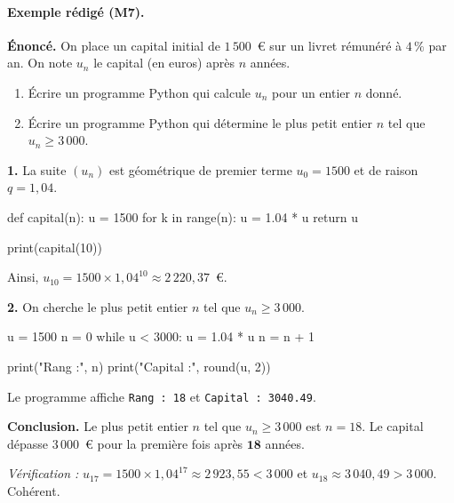 \paragraph{Exemple r\'edig\'e (M7).}

\textbf{\'Enonc\'e.} On place un capital initial de $1\,500$~\euro{} sur un livret r\'emun\'er\'e \`a $4\,\%$ par an. On note $u_n$ le capital (en euros) apr\`es $n$ ann\'ees.

\begin{enumerate}
  \item \'Ecrire un programme Python qui calcule $u_n$ pour un entier $n$ donn\'e.
  \item \'Ecrire un programme Python qui d\'etermine le plus petit entier $n$ tel que $u_n \geq 3\,000$.
\end{enumerate}

\medskip
\textbf{1.} La suite $(u_n)$ est g\'eom\'etrique de premier terme $u_0 = 1500$ et de raison $q = 1{,}04$.


\begin{python}
def capital(n):
    u = 1500
    for k in range(n):
        u = 1.04 * u
    return u

print(capital(10))
\end{python}

Ainsi, $u_{10} = 1500 \times 1{,}04^{10} \approx 2\,220{,}37$~\euro.

\medskip
\textbf{2.} On cherche le plus petit entier $n$ tel que $u_n \geq 3\,000$.


\begin{python}
u = 1500
n = 0
while u < 3000:
    u = 1.04 * u
    n = n + 1

print("Rang :", n)
print("Capital :", round(u, 2))
\end{python}

Le programme affiche \texttt{Rang : 18} et \texttt{Capital : 3040.49}.

\textbf{Conclusion.} Le plus petit entier $n$ tel que $u_n \geq 3\,000$ est $n = 18$. Le capital d\'epasse $3\,000$~\euro{} pour la premi\`ere fois apr\`es $\mathbf{18}$ ann\'ees.

\medskip
\textit{V\'erification :} $u_{17} = 1500 \times 1{,}04^{17} \approx 2\,923{,}55 < 3\,000$ et $u_{18} \approx 3\,040{,}49 > 3\,000$. Coh\'erent.

